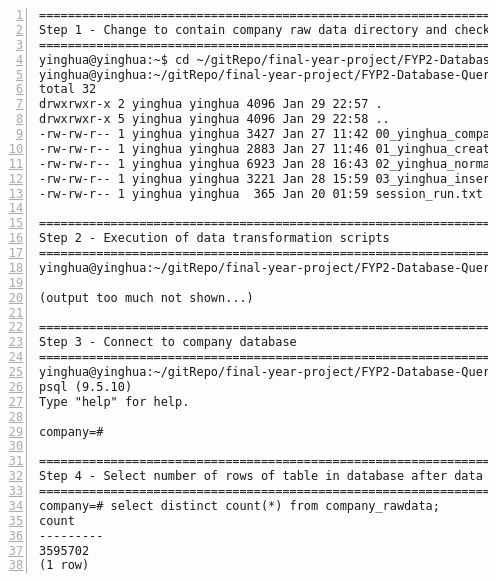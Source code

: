 \lstset{basicstyle=\ttfamily\tiny}  
\begin{lstlisting}[breaklines, frame=single, numbers=left, caption={Execution of PL/pgSQL's scripts for Company data transformation.}, label=commandline-02]
========================================================================================
Step 1 - Change to contain company raw data directory and check the location of scripts
========================================================================================
yinghua@yinghua:~$ cd ~/gitRepo/final-year-project/FYP2-Database-Queries/company-database-queries
yinghua@yinghua:~/gitRepo/final-year-project/FYP2-Database-Queries/company-database-queries$ ls -al
total 32
drwxrwxr-x 2 yinghua yinghua 4096 Jan 29 22:57 .
drwxrwxr-x 5 yinghua yinghua 4096 Jan 29 22:58 ..
-rw-rw-r-- 1 yinghua yinghua 3427 Jan 27 11:42 00_yinghua_company_csv_db_migration.sql  <- This script
-rw-rw-r-- 1 yinghua yinghua 2883 Jan 27 11:46 01_yinghua_create_company_table.sql
-rw-rw-r-- 1 yinghua yinghua 6923 Jan 28 16:43 02_yinghua_normalized_company_DDL.sql
-rw-rw-r-- 1 yinghua yinghua 3221 Jan 28 15:59 03_yinghua_insert_normalized_table_DML.sql
-rw-rw-r-- 1 yinghua yinghua  365 Jan 20 01:59 session_run.txt

========================================================================================
Step 2 - Execution of data transformation scripts 
========================================================================================
yinghua@yinghua:~/gitRepo/final-year-project/FYP2-Database-Queries/company-database-queries$ psql -U yinghua -d company -a -f 00_yinghua_company_csv_db_migration.sql 

(output too much not shown...) 

========================================================================================
Step 3 - Connect to company database
========================================================================================
yinghua@yinghua:~/gitRepo/final-year-project/FYP2-Database-Queries/company-database-queries$ psql company; 
psql (9.5.10)
Type "help" for help.

company=# 

========================================================================================
Step 4 - Select number of rows of table in database after data transformation
========================================================================================
company=# select distinct count(*) from company_rawdata;
count  
---------
3595702
(1 row)

\end{lstlisting}

